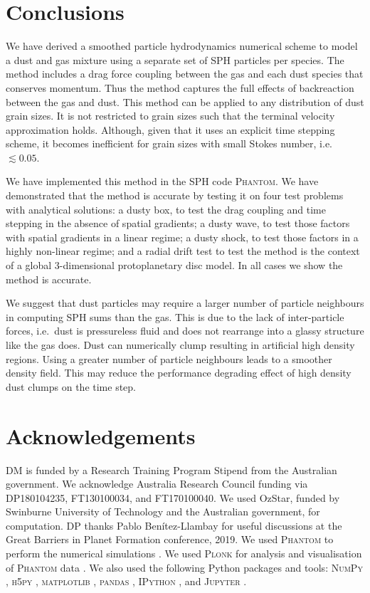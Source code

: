 \documentclass[fleqn,usenatbib]{mnras}
\begin{document}
\section{Conclusions}

We have derived a smoothed particle hydrodynamics numerical scheme to model a
dust and gas mixture using a separate set of SPH particles per species. The
method includes a drag force coupling between the gas and each dust species that
conserves momentum. Thus the method captures the full effects of backreaction
between the gas and dust. This method can be applied to any distribution of dust
grain sizes. It is not restricted to grain sizes such that the terminal velocity
approximation holds. Although, given that it uses an explicit time stepping
scheme, it becomes inefficient for grain sizes with small Stokes number, i.e.
\(\lesssim 0.05\).

We have implemented this method in the SPH code \textsc{Phantom}. We have
demonstrated that the method is accurate by testing it on four test problems
with analytical solutions: a dusty box, to test the drag coupling and time
stepping in the absence of spatial gradients; a dusty wave, to test those
factors with spatial gradients in a linear regime; a dusty shock, to test those
factors in a highly non-linear regime; and a radial drift test to test the
method is the context of a global 3-dimensional protoplanetary disc model. In
all cases we show the method is accurate.

We suggest that dust particles may require a larger number of particle
neighbours in computing SPH sums than the gas. This is due to the lack of
inter-particle forces, i.e.\ dust is pressureless fluid and does not rearrange
into a glassy structure like the gas does. Dust can numerically clump resulting
in artificial high density regions. Using a greater number of particle
neighbours leads to a smoother density field. This may reduce the performance
degrading effect of high density dust clumps on the time step.


\section*{Acknowledgements}

DM is funded by a Research Training Program Stipend from the Australian
government. We acknowledge Australia Research Council funding via DP180104235,
FT130100034, and FT170100040. We used OzStar, funded by Swinburne University of
Technology and the Australian government, for computation. DP thanks Pablo
Benítez-Llambay for useful discussions at the Great Barriers in Planet Formation
conference, 2019. We used \textsc{Phantom} to perform the numerical simulations
\citep{Price2018PASA...35...31P}. We used \textsc{Plonk} for analysis and
visualisation of \textsc{Phantom} data \citep{Mentiplay2019JOSS....4.1884M}. We
also used the following Python packages and tools: \textsc{NumPy}
\citep{Oliphant2006, van-der-Walt2011CSE....13b..22V}, \textsc{h5py}
\citep{Collette2013}, \textsc{matplotlib} \citep{Hunter2007CSE.....9...90H},
\textsc{pandas} \citep{McKinney2010}, \textsc{IPython}
\citep{Perez2007CSE.....9c..21P}, and \textsc{Jupyter} \citep{Kluyver2016}.
\end{document}
